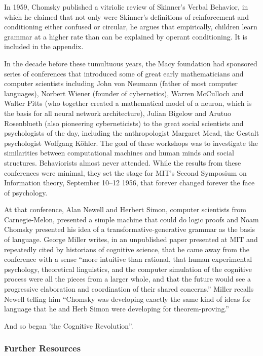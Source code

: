 In 1959, Chomsky published a vitriolic review of Skinner's Verbal Behavior, in which he claimed that not only were Skinner's definitions of reinforcement and conditioning either confused or circular, he argues that empirically, children learn grammar at a higher rate than can be explained by operant conditioning. It is included in the appendix.

In the decade before these tumultuous years, the Macy foundation had sponsored series of conferences that introduced some of great early mathematicians and computer scientists including John von Neumann (father of most computer languages), Norbert Wiener (founder of cybernetics), Warren McCulloch and Walter Pitts (who together created a mathematical model of a neuron, which is the basis for all neural network architecture), Julian Bigelow and Arutuo Rosenblueth (also pioneering cyberneticists) to the great social scientists and psychologists of the day, including the anthropologist Margaret Mead, the Gestalt psychologist Wolfgang Köhler. The goal of these workshops was to investigate the similarities between computational machines and human minds and social structures. Behaviorists almost never attended. While the results from these conferences were minimal, they set the stage for MIT's Second Symposium on Information theory, September 10--12 1956, that forever changed forever the face of psychology. 

At that conference, Alan Newell and Herbert Simon, computer scientists from Carnegie-Melon, presented a simple machine that could do logic proofs and Noam Chomsky presented his idea of a transformative-generative grammar as the basis of language. George Miller writes, in an unpublished paper presented at MIT and repeatedly cited by historians of cognitive science, that he came away from the conference with a sense “more intuitive than rational, that human experimental psychology, theoretical linguistics, and the computer simulation of the cognitive process were all the pieces from a larger whole, and that the future would see a progressive elaboration and coordination of their shared concerns.” Miller recalls Newell telling him “Chomsky was developing exactly the same kind of ideas for language that he and Herb Simon were developing for theorem-proving.”

And so began 'the Cognitive Revolution”.

\subsubsection{Further Resources}
\label{furtherresources}


